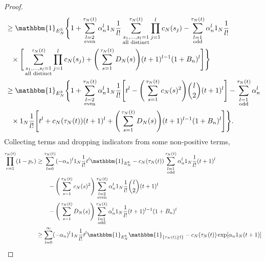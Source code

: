 \documentclass[12pt,authoryear]{article}
\theoremstyle{definition}
\newcommand{\I}[1]{\mathbbm{1}_{\{#1\}}}
\newcommand{\1}[1]{\mathbbm{1}_{#1}}
\newcommand{\ON}{1_N}
\begin{document}
\begin{proof}
\begin{align*}
&\geq \1{E_N^3} \Bigg\{ 1 + 
        \sum_{\substack{l=2 \\ \text{even} }}^{\tau_N(t)} 
        \alpha_n^l \ON \frac{1}{l!} 
        \sum_{\substack{ s_1, \dots, s_l =1 \\ \text{all distinct} }}^{\tau_N(t)}
        \prod_{j=1}^l c_N(s_j) - \sum_{\substack{l=1 \\ \text{odd} }}^{\tau_N(t)} 
        \alpha_n^l \ON \frac{1}{l!} \\
    &\phantom{\geq}\times
        \Bigg[ \sum_{\substack{ s_1, \dots, s_l =1 \\ \text{all distinct} }}^{\tau_N(t)}
        \prod_{j=1}^l c_N(s_j)
        + \Bigg( \sum_{s=1}^{\tau_N(t)} D_N(s) \Bigg)
        (t+1)^{l-1} (1+B_n)^l \Bigg] \Bigg\} \\
&\geq \1{E_N^3} \Bigg\{ 1 + 
        \sum_{\substack{l=2 \\ \text{even} }}^{\tau_N(t)} 
        \alpha_n^l \ON \frac{1}{l!} 
        \Bigg[ t^l - \Bigg( \sum_{s=1}^{\tau_N(t)} c_N(s)^2 \Bigg)
        \binom{l}{2}(t+1)^l \Bigg] - \sum_{\substack{l=1 \\ \text{odd} }}^{\tau_N(t)} 
        \alpha_n^l \\
    &\phantom{\geq}
        \times \ON \frac{1}{l!} \Bigg[ t^l + c_N(\tau_N(t)) (t+1)^l
        + \Bigg( \sum_{s=1}^{\tau_N(t)} D_N(s) \Bigg)
        (t+1)^{l-1} (1+B_n)^l \Bigg] \Bigg\} .
\end{align*}
Collecting terms and dropping indicators from some non-positive terms,
\begin{align}
\prod_{r=1}^{\tau_N(t)} (1-p_r)
&\geq \sum_{l=0}^{\tau_N(t)} (-\alpha_n)^l \ON 
        \frac{1}{l!} t^l \1{E_N^3} - c_N(\tau_N(t)) \sum_{\substack{l=1 \\ \text{odd} }}^{\tau_N(t)} 
        \alpha_n^l \ON \frac{1}{l!} (t+1)^l \notag\\
        &\qquad- \Bigg( \sum_{s=1}^{\tau_N(t)} c_N(s)^2 \Bigg)
        \sum_{\substack{l=2 \\ \text{even} }}^{\tau_N(t)} 
        \alpha_n^l \ON \frac{1}{l!} \binom{l}{2}(t+1)^l \notag\\
    &\qquad- \Bigg( \sum_{s=1}^{\tau_N(t)} D_N(s) \Bigg)
        \sum_{\substack{l=1 \\ \text{odd} }}^{\tau_N(t)} 
        \alpha_n^l \ON \frac{1}{l!} (t+1)^{l-1} (1+B_n)^l \notag\\
&\geq \sum_{l=0}^{\infty} (-\alpha_n)^l \ON 
        \frac{1}{l!} t^l \1{E_N^3} \I{ \tau_N(t) \geq l} - c_N(\tau_N(t)) \exp[ \alpha_n \ON (t+1) ] \notag \\

\end{align}
\end{proof}
\end{document}
